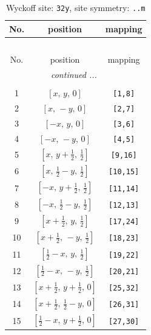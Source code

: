 \documentclass[fleqn,8pt]{jsarticle}
\begin{document}
\begin{longtable}{ccc}
\caption{Wyckoff site: {\tt 32y}, site symmetry: {\tt ..m}}
 \\
 \hline \hline
No. & position & mapping \\ \hline \endfirsthead

\multicolumn{2}{l}{\tablename\ \thetable{}} \\
 \hline \hline
No. & position & mapping \\ \hline \endhead

 \hline \hline
\multicolumn{2}{r}{\footnotesize\it continued ...} \\ \endfoot

 \hline \hline
\multicolumn{2}{r}{} \\ \endlastfoot

1 & $\left[ x,\, y,\, 0 \right]$ & {\tt [1,8]} \\ \hline
2 & $\left[ x,\, - y,\, 0 \right]$ & {\tt [2,7]} \\ \hline
3 & $\left[ - x,\, y,\, 0 \right]$ & {\tt [3,6]} \\ \hline
4 & $\left[ - x,\, - y,\, 0 \right]$ & {\tt [4,5]} \\ \hline
5 & $\left[ x,\, y + \frac{1}{2},\, \frac{1}{2} \right]$ & {\tt [9,16]} \\ \hline
6 & $\left[ x,\, \frac{1}{2} - y,\, \frac{1}{2} \right]$ & {\tt [10,15]} \\ \hline
7 & $\left[ - x,\, y + \frac{1}{2},\, \frac{1}{2} \right]$ & {\tt [11,14]} \\ \hline
8 & $\left[ - x,\, \frac{1}{2} - y,\, \frac{1}{2} \right]$ & {\tt [12,13]} \\ \hline
9 & $\left[ x + \frac{1}{2},\, y,\, \frac{1}{2} \right]$ & {\tt [17,24]} \\ \hline
10 & $\left[ x + \frac{1}{2},\, - y,\, \frac{1}{2} \right]$ & {\tt [18,23]} \\ \hline
11 & $\left[ \frac{1}{2} - x,\, y,\, \frac{1}{2} \right]$ & {\tt [19,22]} \\ \hline
12 & $\left[ \frac{1}{2} - x,\, - y,\, \frac{1}{2} \right]$ & {\tt [20,21]} \\ \hline
13 & $\left[ x + \frac{1}{2},\, y + \frac{1}{2},\, 0 \right]$ & {\tt [25,32]} \\ \hline
14 & $\left[ x + \frac{1}{2},\, \frac{1}{2} - y,\, 0 \right]$ & {\tt [26,31]} \\ \hline
15 & $\left[ \frac{1}{2} - x,\, y + \frac{1}{2},\, 0 \right]$ & {\tt [27,30]} \\ \hline

\end{longtable}
\end{document}
